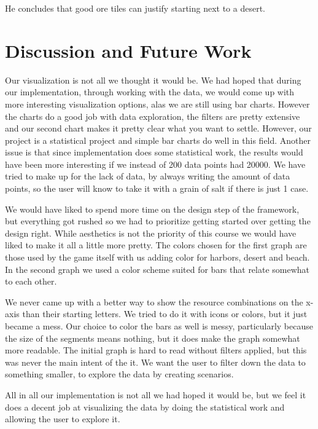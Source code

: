 \documentclass[journal]{vgtc}                %
\begin{document}
He concludes that good ore tiles can justify starting next to a desert.

\section{Discussion and Future Work}

Our visualization is not all we thought it would be. We had hoped that during
our implementation, through working with the data, we would come up with
more interesting visualization options, alas we are still using bar charts.
However the charts do a good job with data exploration, the filters are pretty
extensive and our second chart makes it pretty clear what you want to settle.
However, our project is a statistical project and simple bar charts do well
in this field. Another issue is that since implementation does some statistical
work, the results would have been more interesting if we instead of 200
data points had 20000. We have tried to make up for the lack of data, by
always writing the amount of data points, so the user will know to take it
with a grain of salt if there is just 1 case.

We would have liked to spend more time on the design step of the framework,
but everything got rushed so we had to prioritize getting started over getting
the design right. While aesthetics is not the priority of this course we would
have liked to make it all a little more pretty. The colors chosen for the
first graph are those used by the game itself with us adding color for
harbors, desert and beach. In the second graph we used a color scheme suited
for bars that relate somewhat to each other. 

We never came up with a better way to show the resource combinations on the
x-axis than their starting letters. We tried to do it with icons or colors,
but it just became a mess. Our choice to color the bars as well is messy,
particularly because the size of the segments means nothing, but it does make
the graph somewhat more readable. The initial graph is hard to read without
filters applied, but this was never the main intent of the it. We want the
user to filter down the data to something smaller, to explore the data by
creating scenarios.

All in all our implementation is not all we had hoped it would be, but we feel
it does a decent job at visualizing the data by doing the statistical work and
allowing the user to explore it.

\end{document}
